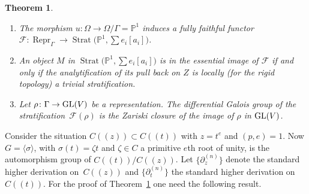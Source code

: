 \documentclass[10pt,a4paper]{amsart}
\numberwithin{equation}{section}
\newtheorem{Theorem}{Theorem}[section]
\begin{document}
 \begin{Theorem}\label{5.1}\quad
 \begin{enumerate}\itemsep=0pt
\item[$(1)$] The morphism $u\colon \Omega \rightarrow \Omega/\Gamma=\mathbb{P}^1$ induces a fully faithful functor $\mathcal{F}\colon \operatorname{Repr}_\Gamma \rightarrow \operatorname{Strat}\big(\mathbb{P}^1,\allowbreak \sum e_i[a_i]\big)$.
 \item[$(2)$] An object $M$ in $\operatorname{Strat}\big(\mathbb{P}^1,\sum e_i[a_i]\big)$ is in the essential image of $\mathcal{F}$ if and only if the analytification of its pull back on $Z$ is locally (for the rigid topology) a trivial stratification.
 \item[$(3)$] Let $\rho\colon \Gamma \rightarrow {\rm GL}(V)$ be a representation. The differential Galois group of the stratifica\-tion~$\mathcal{F}(\rho)$ is the Zariski closure of the image of $\rho$ in ${\rm GL}(V)$.
 \end{enumerate}
 \end{Theorem}

 Consider the situation $C((z))\subset C((t))$ with $z=t^e$ and $(p,e)=1$. Now $G=\langle \sigma \rangle$, with $\sigma (t)=\zeta t$ and $\zeta \in C$ a primitive $e$th root of unity, is the automorphism group of $C((t))/C((z))$. Let $\big\{\partial _z^{(n)}\big\}$ denote the standard higher derivation on~$C((z))$ and $\big\{\partial _t^{(n)}\big\}$ the standard higher derivation on $C((t))$. For the proof of Theorem~\ref{5.1} one need the following result.
\end{document}
